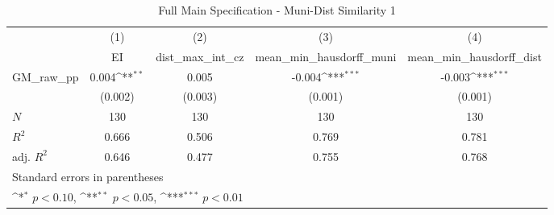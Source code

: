 \begin{table}[htbp]\centering
\def\sym#1{\ifmmode^{#1}\else\(^{#1}\)\fi}
\caption{Full Main Specification - Muni-Dist Similarity 1}
\begin{tabular}{l*{4}{c}}
\hline\hline
            &\multicolumn{1}{c}{(1)}&\multicolumn{1}{c}{(2)}&\multicolumn{1}{c}{(3)}&\multicolumn{1}{c}{(4)}\\
            &\multicolumn{1}{c}{EI}&\multicolumn{1}{c}{dist\_max\_int\_cz}&\multicolumn{1}{c}{mean\_min\_hausdorff\_muni}&\multicolumn{1}{c}{mean\_min\_hausdorff\_dist}\\
\hline
GM\_raw\_pp   &       0.004\sym{**} &       0.005         &      -0.004\sym{***}&      -0.003\sym{***}\\
            &     (0.002)         &     (0.003)         &     (0.001)         &     (0.001)         \\
\hline
\(N\)       &         130         &         130         &         130         &         130         \\
\(R^{2}\)   &       0.666         &       0.506         &       0.769         &       0.781         \\
adj. \(R^{2}\)&       0.646         &       0.477         &       0.755         &       0.768         \\
\hline\hline
\multicolumn{5}{l}{\footnotesize Standard errors in parentheses}\\
\multicolumn{5}{l}{\footnotesize \sym{*} \(p<0.10\), \sym{**} \(p<0.05\), \sym{***} \(p<0.01\)}\\
\end{tabular}
\end{table}

